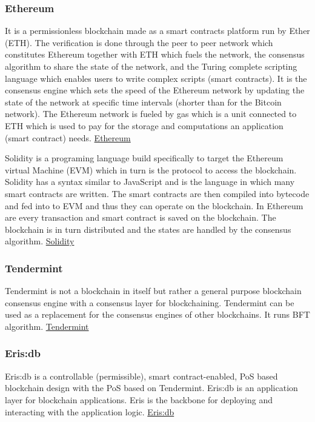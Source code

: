 \subsubsection{Ethereum}
It is a permissionless blockchain made as a smart contracts platform run by Ether (ETH). The verification is done through the peer to peer network which constitutes Ethereum together with ETH which fuels the network, the consensus algorithm to share the state of the network, and the Turing complete scripting language which enables users to write complex scripts (smart contracts). It is the consensus engine which sets the speed of the Ethereum network by updating the state of the network at specific time intervals (shorter than for the Bitcoin network). The Ethereum network is fueled by gas which is a unit connected to ETH which is used to pay for the storage and computations an application (smart contract) needs.
\href{https://www.ethereum.org/}{Ethereum}

Solidity is a programing language build specifically to target the Ethereum virtual Machine (EVM) which in turn is the protocol to access the blockchain. Solidity has a syntax similar to JavaScript and is the language in which many smart contracts are written. The smart contracts are then compiled into bytecode and fed into to EVM and thus they can operate on the blockchain. In Ethereum are every transaction and smart contract is saved on the blockchain. The blockchain is in turn distributed and the states are handled by the consensus algorithm.
\href{https://solidity.readthedocs.io/en/v0.5.7/}{Solidity}

\subsubsection{Tendermint}
Tendermint is not a blockchain in itself but rather a general purpose blockchain consensus engine with a consensus layer for blockchaining. Tendermint can be used as a replacement for the consensus engines of other blockchains. It runs BFT algorithm.
\href{https://tendermint.com/}{Tendermint}

\subsubsection{Eris:db}
Eris:db is a controllable (permissible), smart contract-enabled, PoS based blockchain design with the PoS based on Tendermint. Eris:db is an application layer for blockchain applications. Eris is the backbone for deploying and interacting with the application logic.
\href{https://github.com/vulcanize/eris-db}{Eris:db}

